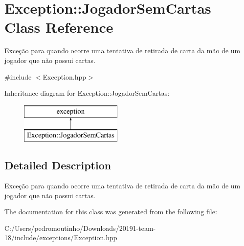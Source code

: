 \hypertarget{class_exception_1_1_jogador_sem_cartas}{}\section{Exception\+::Jogador\+Sem\+Cartas Class Reference}
\label{class_exception_1_1_jogador_sem_cartas}


Exceção para quando ocorre uma tentativa de retirada de carta da mão de um jogador que não possui cartas.  




{\ttfamily \#include $<$Exception.\+hpp$>$}

Inheritance diagram for Exception\+::Jogador\+Sem\+Cartas\+:\begin{figure}[H]
\begin{center}
\leavevmode
\includegraphics[height=2.000000cm]{class_exception_1_1_jogador_sem_cartas}
\end{center}
\end{figure}


\subsection{Detailed Description}
Exceção para quando ocorre uma tentativa de retirada de carta da mão de um jogador que não possui cartas. 



The documentation for this class was generated from the following file\+:\begin{DoxyCompactItemize}
\item 
C\+:/\+Users/pedromoutinho/\+Downloads/20191-\/team-\/18/include/exceptions/Exception.\+hpp\end{DoxyCompactItemize}
